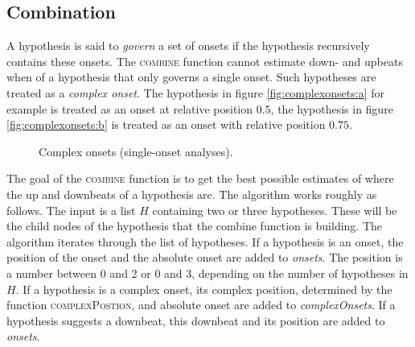 \subsection{Combination}
\label{sec:combination}

A hypothesis is said to \textit{govern} a set of onsets if the hypothesis recursively contains these onsets. The \textsc{combine} function cannot estimate down- and upbeats when of a hypothesis that only governs a single onset. Such hypotheses are treated as a \textit{complex onset}. The hypothesis in figure \ref{fig:complexonsets:a} for example is treated as an onset at relative position $0.5$, the hypothesis in figure \ref{fig:complexonsets:b} is treated as an onset with relative position $0.75$.

\begin{figure}
\centering
{}
\caption{Complex onsets (single-onset analyses).}
\label{fig:complexonsets}
\end{figure}

The goal of the \textsc{combine} function is to get the best possible estimates of where the up and downbeats of a hypothesis are. The algorithm works roughly as follows. The input is a list $H$ containing two or three hypotheses. These will be the child nodes of the hypothesis that the combine function is building. The algorithm iterates through the list of hypotheses. If a hypothesis is an onset, the position of the onset and the absolute onset are added to \textit{onsets}. The position is a number between 0 and 2 or 0 and 3, depending on the number of hypotheses in $H$. If a hypothesis is a complex onset, its complex position, determined by the function \textsc{complexPostion}, and absolute onset are added to \textit{complexOnsets}. If a hypothesis suggests a downbeat, this downbeat and its position are added to \textit{onsets}.

